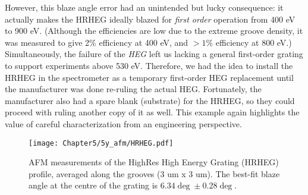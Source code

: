 However, this blaze angle error had an unintended but lucky consequence: it actually makes the HRHEG ideally blazed for \emph{first order} operation from 400 eV to 900 eV.  (Although the efficiencies are low due to the extreme groove density, it was measured to give 2\% efficiency at 400 eV, and $>1\%$ efficiency at 800 eV.)  Simultaneously, the failure of the \emph{HEG} left us lacking a general first-order grating to support experiments above 530 eV.  Therefore, we had the idea to install the HRHEG in the spectrometer as a temporary first-order HEG replacement until the manufacturer was done re-ruling the actual HEG.  Fortunately, the manufacturer also had a spare blank (substrate) for the HRHEG, so they could proceed with ruling another copy of it as well.  This example again highlights the value of careful characterization from an engineering perspective.

\begin{figure}[htbp] %
   \centering
   \texttt{[image: Chapter5/5y\_afm/HRHEG.pdf]} 
   \caption{AFM measurements of the HighRes High Energy Grating (HRHEG) profile, averaged along the grooves (3 um x 3 um).  The best-fit blaze angle at the centre of the grating is $6.34\deg \pm 0.28\deg$.}
   \label{5y-hrheg}
\end{figure}
